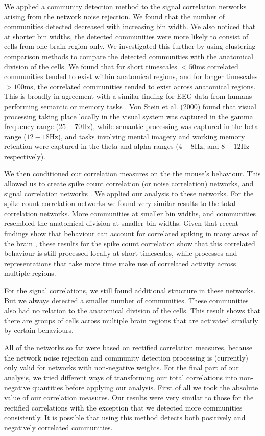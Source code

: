 We applied a community detection method \parencite{humphries2} to the signal correlation networks arising from the network noise rejection. We found that the number of communities detected decreased with increasing bin width. We also noticed that at shorter bin widths, the detected communities were more likely to consist of cells from one  brain region only. We investigated this further by using clustering comparison methods to compare the detected communities with the anatomical division of the cells. We found that for short timescales $<50$ms correlated communities tended to exist within anatomical regions, and for longer timescales $>100$ms, the correlated communities tended to exist across anatomical regions. This is broadly in agreement with a similar finding for EEG data from humans performing semantic or memory tasks \parencite{von_stein}. Von Stein et al. (2000) found that visual processing taking place locally in the visual system was captured in the gamma frequency range ($25-70$Hz), while semantic processing was captured in the beta range ($12-18$Hz), and tasks involving mental imagery and working memory retention were captured in the theta and alpha ranges ($4-8$Hz, and $8-12$Hz respectively).

We then conditioned our correlation measures on the the mouse's behaviour. This allowed us to create spike count correlation (or noise correlation) networks, and signal correlation networks \parencite{cohen2}. We applied our analysis to these networks. For the spike count correlation networks we found very similar results to the total correlation networks. More communities at smaller bin widths, and communities resembled the anatomical division at smaller bin widths. Given that recent findings show that behaviour can account for correlated spiking in many areas of the brain \parencite{stringer}, these results for the spike count correlation show that this correlated behaviour is still processed locally at short timescales, while processes and representations that take more time make use of correlated activity across multiple regions.

For the signal correlations, we still found additional structure in these networks. But we always detected a smaller number of communities. These communities also had no relation to the anatomical division of the cells. This result shows that there are groups of cells across multiple brain regions that are activated similarly by certain behaviours.

All of the networks so far were based on rectified correlation measures, because the network noise rejection and community detection processing is (currently) only valid for networks with non-negative weights. For the final part of our analysis, we tried different ways of transforming our total correlations into non-negative quantities before applying our analysis. First of all we took the absolute value of our correlation measures. Our results were very similar to those for the rectified correlations with the exception that we detected more communities consistently. It is possible that using this method detects both positively and negatively correlated communities.

